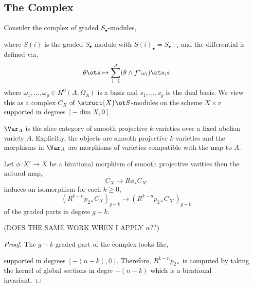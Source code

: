 \documentclass[12pt]{article}
\begin{document}
\subsection{The Complex}

\newcommand{\R}{\mathbb{R}}

Consider the complex of graded $S_\bullet$-modules,
\begin{center}
\end{center}
where $S(i)$ is the graded $S_\bullet$-module with $S(i)_{\bullet} = S_{\bullet + i}$ and the differential is defined via,
\[ \theta \ot s \mapsto \sum_{i = 1}^g (\theta \wedge f^* \omega_i) \ot s_i s \]
where $\omega_1, \dots, \omega_g \in H^0(A, \Omega_A)$ is a basis and $s_1, \dots, s_g$ is the dual basis. We view this as a complex $C_X$ of $\struct{X} \ot S$-modules on the scheme $X \times v$ supported in degrees $[-\dim{X}, 0]$.

\begin{defn}
$\Var_A$ is the slice category of smooth projective $k$-varieties over a fixed abelian variety $A$. Explicitly, the objects are smooth projective $k$-varieties and the morphisms in $\Var_A$ are morphisms of varieties compatible with the map to $A$.
\end{defn}

\begin{prop}
Let $\phi :  X' \to X$ be a birational morphism of smooth projective varities then the natural map,
\[ C_{X} \to R \phi_* C_{X'} \]
induces an isomorphism for each $k \ge 0$,
\[ (R^{k-n} p_{2 *} C_{X})_{g-k} \to (R^{k-n} p_{2 *} C_{X'})_{g-k} \]
of the graded parts in degree $g-k$.
\end{prop}

(DOES THE SAME WORK WHEN I APPLY $\alpha$??)

\begin{proof}
The $g-k$ graded part of the complex looks like,
\begin{center}
\end{center}
supported in degrees $[-(n-k), 0]$. Therefore, $R^{k-n} p_{2*}$ is computed by taking the kernel of global sections in degre $-(n-k)$ which is a birational invariant. 
\end{proof}
\end{document}
